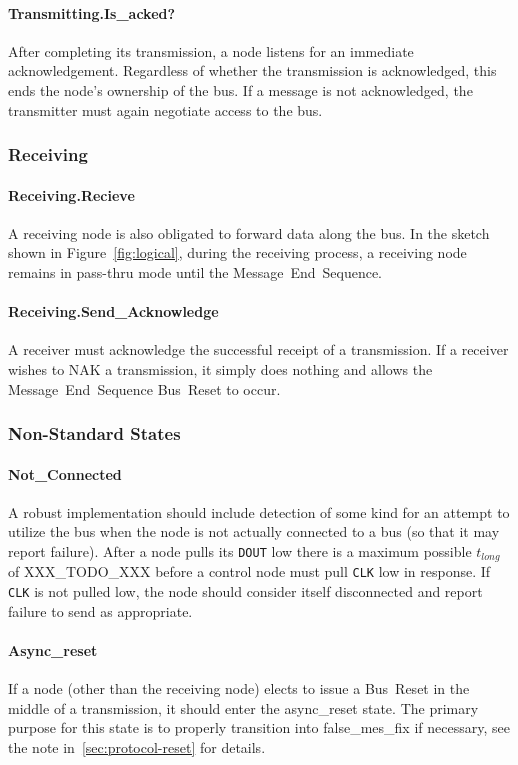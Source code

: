 \paragraph{Transmitting.{\sc Is\_acked?}}
After completing its transmission, a node listens for an immediate
acknowledgement. Regardless of whether the transmission is acknowledged, this
ends the node's ownership of the bus. If a message is not acknowledged, the
transmitter must again negotiate access to the bus.

\subsubsection{Receiving}

\paragraph{Receiving.{\sc Recieve}}
A receiving node is also obligated to forward data along the bus. In the
sketch shown in Figure~\ref{fig:logical}, during the receiving process, a
receiving node remains in pass-thru mode until the Message~End~Sequence.

\paragraph{Receiving.{\sc Send\_Acknowledge}}
A receiver must acknowledge the successful receipt of a transmission. If a
receiver wishes to NAK a transmission, it simply does nothing and allows the
Message~End~Sequence Bus~Reset to occur.

\subsubsection{Non-Standard States}

\paragraph{\sc Not\_Connected}
A robust implementation should include detection of some kind for an attempt
to utilize the bus when the node is not actually connected to a bus (so that
it may report failure). After a node pulls its {\tt DOUT} low there is a
maximum possible $t_{long}$ of XXX\_TODO\_XXX before a control node must pull
{\tt CLK} low in response. If {\tt CLK} is not pulled low, the node should
consider itself disconnected and report failure to send as appropriate.

\paragraph{\sc Async\_reset}
If a node (other than the receiving node) elects to issue a Bus~Reset in the
middle of a transmission, it should enter the {\sc async\_reset} state. The
primary purpose for this state is to properly transition into {\sc
false\_mes\_fix} if necessary, see the note in~\ref{sec:protocol-reset} for
details.

